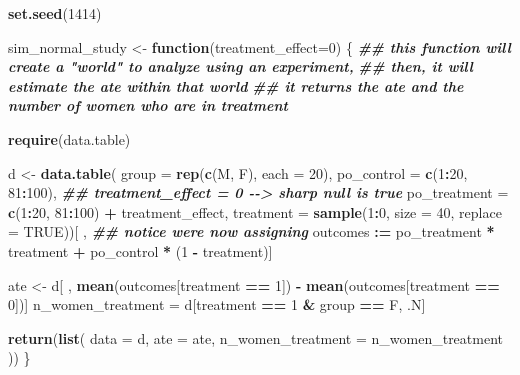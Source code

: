 \documentclass[
]{article}
\newenvironment{Shaded}{\begin{snugshade}}{\end{snugshade}}
\newcommand{\AttributeTok}[1]{\textcolor[rgb]{0.13,0.29,0.53}{#1}}
\newcommand{\ConstantTok}[1]{\textcolor[rgb]{0.56,0.35,0.01}{#1}}
\newcommand{\ControlFlowTok}[1]{\textcolor[rgb]{0.13,0.29,0.53}{\textbf{#1}}}
\newcommand{\DecValTok}[1]{\textcolor[rgb]{0.00,0.00,0.81}{#1}}
\newcommand{\DocumentationTok}[1]{\textcolor[rgb]{0.56,0.35,0.01}{\textbf{\textit{#1}}}}
\newcommand{\FunctionTok}[1]{\textcolor[rgb]{0.13,0.29,0.53}{\textbf{#1}}}
\newcommand{\NormalTok}[1]{#1}
\newcommand{\OtherTok}[1]{\textcolor[rgb]{0.56,0.35,0.01}{#1}}
\newcommand{\SpecialCharTok}[1]{\textcolor[rgb]{0.81,0.36,0.00}{\textbf{#1}}}
\newcommand{\StringTok}[1]{\textcolor[rgb]{0.31,0.60,0.02}{#1}}
\theoremstyle{definition}
\theoremstyle{definition}
\theoremstyle{definition}
\theoremstyle{definition}
\theoremstyle{remark}
\begin{document}
\begin{Shaded}
\begin{Highlighting}[]
\FunctionTok{set.seed}\NormalTok{(}\DecValTok{1414}\NormalTok{)}

\NormalTok{sim\_normal\_study }\OtherTok{\textless{}{-}} \ControlFlowTok{function}\NormalTok{(}\AttributeTok{treatment\_effect=}\DecValTok{0}\NormalTok{) \{}
  \DocumentationTok{\#\# this function will create a "world" to analyze using an experiment, }
  \DocumentationTok{\#\# then, it will estimate the ate within that world }
  \DocumentationTok{\#\# it returns the ate and the number of women who are in treatment }
  
  \FunctionTok{require}\NormalTok{(data.table)}
  
\NormalTok{  d }\OtherTok{\textless{}{-}} \FunctionTok{data.table}\NormalTok{(}
      \AttributeTok{group        =} \FunctionTok{rep}\NormalTok{(}\FunctionTok{c}\NormalTok{(}\StringTok{\textquotesingle{}M\textquotesingle{}}\NormalTok{, }\StringTok{\textquotesingle{}F\textquotesingle{}}\NormalTok{), }\AttributeTok{each =} \DecValTok{20}\NormalTok{), }
      \AttributeTok{po\_control   =} \FunctionTok{c}\NormalTok{(}\DecValTok{1}\SpecialCharTok{:}\DecValTok{20}\NormalTok{, }\DecValTok{81}\SpecialCharTok{:}\DecValTok{100}\NormalTok{), }
        \DocumentationTok{\#\# treatment\_effect = 0 {-}{-}\textgreater{} sharp null is true}
      \AttributeTok{po\_treatment =} \FunctionTok{c}\NormalTok{(}\DecValTok{1}\SpecialCharTok{:}\DecValTok{20}\NormalTok{, }\DecValTok{81}\SpecialCharTok{:}\DecValTok{100}\NormalTok{) }\SpecialCharTok{+}\NormalTok{ treatment\_effect, }
      \AttributeTok{treatment =} \FunctionTok{sample}\NormalTok{(}\DecValTok{1}\SpecialCharTok{:}\DecValTok{0}\NormalTok{, }\AttributeTok{size =} \DecValTok{40}\NormalTok{, }\AttributeTok{replace =} \ConstantTok{TRUE}\NormalTok{))[ , }\DocumentationTok{\#\# notice we\textquotesingle{}re now assigning}
\NormalTok{      outcomes }\SpecialCharTok{:=}\NormalTok{ po\_treatment }\SpecialCharTok{*}\NormalTok{ treatment }\SpecialCharTok{+}\NormalTok{ po\_control }\SpecialCharTok{*}\NormalTok{ (}\DecValTok{1} \SpecialCharTok{{-}}\NormalTok{ treatment)]}

\NormalTok{  ate }\OtherTok{\textless{}{-}}\NormalTok{ d[ , }\FunctionTok{mean}\NormalTok{(outcomes[treatment }\SpecialCharTok{==} \DecValTok{1}\NormalTok{]) }\SpecialCharTok{{-}} \FunctionTok{mean}\NormalTok{(outcomes[treatment }\SpecialCharTok{==} \DecValTok{0}\NormalTok{])]}
\NormalTok{  n\_women\_treatment }\OtherTok{=}\NormalTok{ d[treatment }\SpecialCharTok{==} \DecValTok{1} \SpecialCharTok{\&}\NormalTok{ group }\SpecialCharTok{==} \StringTok{\textquotesingle{}F\textquotesingle{}}\NormalTok{, .N]}

  \FunctionTok{return}\NormalTok{(}\FunctionTok{list}\NormalTok{(}
    \AttributeTok{data =}\NormalTok{ d,}
    \AttributeTok{ate =}\NormalTok{ ate, }
    \AttributeTok{n\_women\_treatment =}\NormalTok{ n\_women\_treatment}
\NormalTok{    ))}
\NormalTok{\}}
\end{Highlighting}
\end{Shaded}
\end{document}
